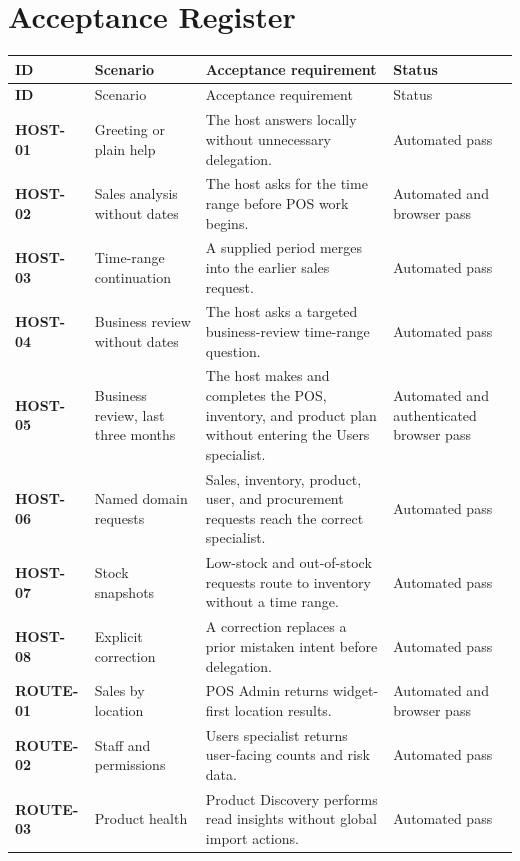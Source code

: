 \documentclass[10pt]{article}
\begin{document}
\section{Acceptance Register}
\footnotesize
\begin{longtable}{@{}>{\bfseries\color{navy}}p{}@{\hspace{0.7em}} p{}@{\hspace{0.7em}} p{}@{\hspace{0.7em}} p{}@{}}
\toprule
ID & Scenario & Acceptance requirement & Status \\
\midrule
\endfirsthead
\toprule
ID & Scenario & Acceptance requirement & Status \\
\midrule
\endhead
HOST-01 & Greeting or plain help & The host answers locally without unnecessary delegation. & Automated pass \\
HOST-02 & Sales analysis without dates & The host asks for the time range before POS work begins. & Automated and browser pass \\
HOST-03 & Time-range continuation & A supplied period merges into the earlier sales request. & Automated pass \\
HOST-04 & Business review without dates & The host asks a targeted business-review time-range question. & Automated pass \\
HOST-05 & Business review, last three months & The host makes and completes the POS, inventory, and product plan without entering the Users specialist. & Automated and authenticated browser pass \\
HOST-06 & Named domain requests & Sales, inventory, product, user, and procurement requests reach the correct specialist. & Automated pass \\
HOST-07 & Stock snapshots & Low-stock and out-of-stock requests route to inventory without a time range. & Automated pass \\
HOST-08 & Explicit correction & A correction replaces a prior mistaken intent before delegation. & Automated pass \\
ROUTE-01 & Sales by location & POS Admin returns widget-first location results. & Automated and browser pass \\
ROUTE-02 & Staff and permissions & Users specialist returns user-facing counts and risk data. & Automated pass \\
ROUTE-03 & Product health & Product Discovery performs read insights without global import actions. & Automated pass \\

\end{longtable}
\end{document}
